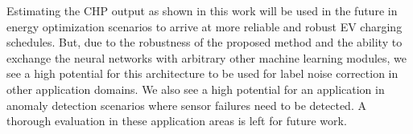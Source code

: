 \documentclass[runningheads, envcountsame, a4paper]{llncs}
\begin{document}
Estimating the CHP output as shown in this work will be used in the future in energy optimization scenarios to arrive at more reliable and robust EV charging schedules. 
But, due to the robustness of the proposed method and the ability to exchange the neural networks with arbitrary other machine learning modules, we see a high potential for this architecture to be used for label noise correction in other application domains.
We also see a high potential for an application in anomaly detection scenarios where sensor failures need to be detected. 
A thorough evaluation in these application areas is left for future work.  




\end{document}
